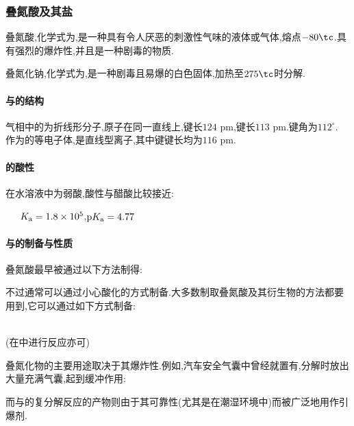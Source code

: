 \documentclass{ctexart}
\begin{document}
\subsubsection{叠氮酸及其盐}
\begin{substance}[\ce{HN3}]
    叠氮酸,化学式为,是一种具有令人厌恶的刺激性气味的液体或气体,熔点$-80\tc$.具有强烈的爆炸性,并且是一种剧毒的物质.
\end{substance}
\begin{substance}[\ce{NaN3}]
    叠氮化钠,化学式为,是一种剧毒且易爆的白色固体,加热至$275\tc$时分解.
\end{substance}
\paragraph{与的结构}
气相中的为折线形分子,原子在同一直线上,键长$124\text{ pm}$,键长$113\text{ pm}$.键角为$112^\circ$.\\
\indent {}作为的等电子体,是直线型离子,其中键键长均为$116\text{ pm}$.
\paragraph{的酸性}
在水溶液中为弱酸,酸性与醋酸比较接近:
\begin{center}
    \ \ \ $K_\text a=1.8\times10^5$,$\text pK_\text a=4.77$
\end{center}
\paragraph{与的制备与性质}
叠氮酸最早被通过以下方法制得:
\begin{center}
\end{center}
不过通常可以通过小心酸化的方式制备.大多数制取叠氮酸及其衍生物的方法都要用到,它可以通过如下方式制备:
\begin{center}
    \\
    (在中进行反应亦可)\\
\end{center}
叠氮化物的主要用途取决于其爆炸性.例如,汽车安全气囊中曾经就置有,分解时放出大量充满气囊,起到缓冲作用:
\begin{center}
\end{center}
而与的复分解反应的产物则由于其可靠性(尤其是在潮湿环境中)而被广泛地用作引爆剂.
\end{document}
